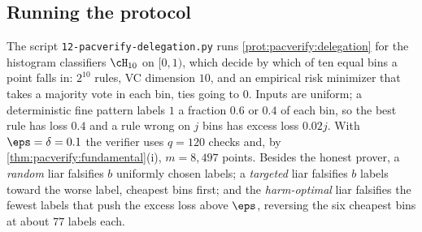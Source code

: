 \begin{refsection}
\section{Running the protocol}\label{sec:pacverify:running}

The script \texttt{12-pacverify-delegation.py} runs \cref{prot:pacverify:delegation} for the histogram classifiers $\cH_{10}$ on $[0,1)$, which decide by which of ten equal bins a point falls in: $2^{10}$ rules, VC dimension $10$, and an empirical risk minimizer that takes a majority vote in each bin, ties going to $0$. Inputs are uniform; a deterministic fine pattern labels $1$ a fraction $0.6$ or $0.4$ of each bin, so the best rule has loss $0.4$ and a rule wrong on $j$ bins has excess loss $0.02j$. With $\eps=\delta=0.1$ the verifier uses $q=120$ checks and, by \cref{thm:pacverify:fundamental}(i), $m=8{,}497$ points. Besides the honest prover, a \emph{random} liar falsifies $b$ uniformly chosen labels; a \emph{targeted} liar falsifies $b$ labels toward the worse label, cheapest bins first; and the \emph{harm-optimal} liar falsifies the fewest labels that push the excess loss above $\eps$, reversing the six cheapest bins at about $77$ labels each.


\end{refsection}
